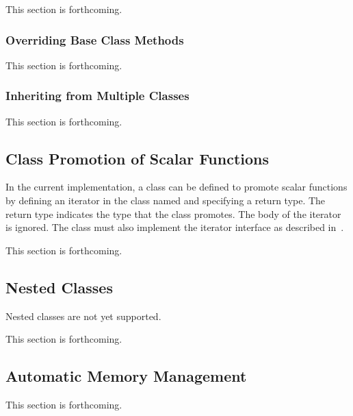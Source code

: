 This section is forthcoming.

\subsubsection{Overriding Base Class Methods}
\label{Overriding_Base_Class_Methods}

This section is forthcoming.

\subsubsection{Inheriting from Multiple Classes}
\label{Inheriting_from_Multiple_Classes}

This section is forthcoming.

\subsection{Class Promotion of Scalar Functions}
\label{Scalar Promotion}

\begin{implementation}
In the current implementation, a class can be defined to promote
scalar functions by defining an iterator in the class
named  and specifying a return type.  The return type
indicates the type that the class promotes.  The body of
the  iterator is ignored.  The class must also implement
the iterator interface as described in~.
\end{implementation}

This section is forthcoming.

\subsection{Nested Classes}
\label{Nested_Classes}

\begin{implementation}
Nested classes are not yet supported.
\end{implementation}

This section is forthcoming.

\subsection{Automatic Memory Management}
\label{Automatic_Memory_Management}

This section is forthcoming.
